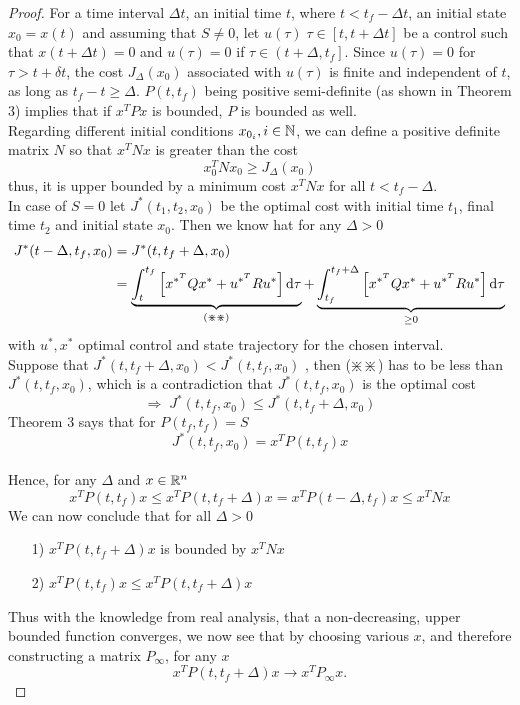 \documentclass[paper=a4, pagesize, DIV=calc, BCOR=12.5mm, twoside=on, onecolumn=on, open = any, titlepage =on, parskip =half-, headsepline = on, footsepline = on, chapterprefix = on, appendixprefix = off, fontsize = 12pt, numbers = noenddot, abstract = on]{scrbook}
\numberwithin{equation}{chapter}
\theoremstyle{definition}
\theoremstyle{plain}
\theoremstyle{plain}
\theoremstyle{remark}
\theoremstyle{plain}
\theoremstyle{plain}
\begin{document}
\begin{proof}
For a time interval $\Delta t$, an initial time $t$, where $t < t_f - \Delta t$, an initial state $x_0 = x(t)$ and assuming that $S \neq 0$, let $u(\tau) \; \tau \in \left[ t, t + \Delta t \right]$ be a control such that $x(t + \Delta t) = 0$ and $u(\tau) = 0$ if $\tau \in \left( t+\Delta, t_f \right]$. Since  $u(\tau) = 0$ for $\tau > t + \delta t$, the cost $J_\Delta (x_0)$ associated with $u(\tau)$ is finite and independent of $t$, as long as $t_f - t \geq \Delta$. $P(t, t_f)$ being positive semi-definite (as shown in Theorem 3) implies that if $x^TPx$ is bounded, $P$ is bounded as well.\\
Regarding different initial conditions $x_{0_i}, i \in \mathbb{N}$, we can define a positive definite matrix $N$ so that $x^TNx$ is greater than the cost
\[
x_0^TNx_0 \geq  J_\Delta(x_0)
\]
thus, it is upper bounded by a minimum cost $x^TNx$ for all $t < t_f - \Delta$.\\
In case of $S =0$ let $J^*(t_1, t_2, x_0)$ be the optimal cost with initial time $t_1$, final time $t_2$ and initial state $x_0$. Then we know hat for any $\Delta >0$
\begin{align*}
J^*(t-\Delta, t_f, x_0) &= J^*(t, t_f + \Delta, x_0)\\
& = \underbrace{\int_t^{t_f} \left[x^{*^T} Q x^* + u^{*^T}Ru^* \right] \mathop{}\!\mathrm{d} \tau}_{(\divideontimes \divideontimes)} + \underbrace{\int_{t_f}^{t_f + \Delta} \left[x^{*^T} Q x^* + u^{*^T}Ru^* \right] \mathop{}\!\mathrm{d} \tau}_{\geq 0}
\end{align*}
with $u^*, x^*$ optimal control and state trajectory for the chosen interval.\\
Suppose that $J^*(t, t_f + \Delta, x_0) < J^*(t, t_f, x_0)$ , then ($\divideontimes \divideontimes$) has to be less than  $J^*(t, t_f, x_0)$, which is a contradiction that $ J^*(t, t_f, x_0)$ is the optimal cost\[
\Rightarrow \;  J^*(t, t_f, x_0) \leq J^*(t, t_f + \Delta, x_0)
\]
Theorem 3 says that for $P(t_f, t_f) = S$
\[
J^*(t, t_f, x_0) = x^TP(t, t_f)x
\]\\
Hence, for any $\Delta$ and $x \in \mathbb{R}^n$
\[
x^TP(t, t_f)x \leq x^TP(t, t_f + \Delta)x = x^TP(t - \Delta, t_f)x \leq x^TNx
\]
We can now conclude that for all $\Delta > 0$
\begin{itemize}
\item[1)] $x^TP(t, t_f + \Delta)x$ is bounded by $x^TNx$
\item[2)] $x^TP(t, t_f)x \leq x^TP(t, t_f + \Delta)x$
\end{itemize}
Thus with the knowledge from real analysis, that a non-decreasing, upper bounded function converges, we now see that by choosing various $x$, and therefore constructing a matrix $P_\infty$, for any $x$
\[
x^TP(t, t_f + \Delta)x \rightarrow x^TP_\infty x.
\]
\end{proof}
\end{document}
